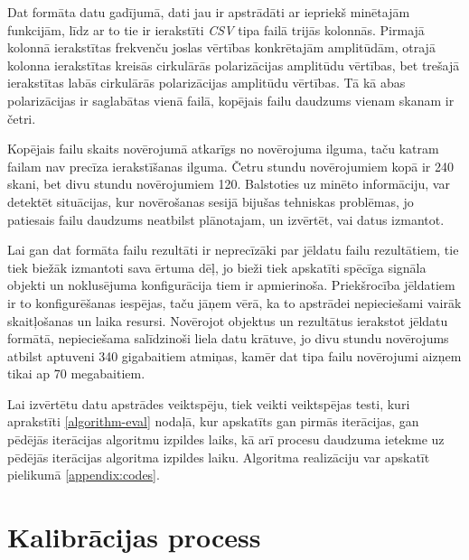 Dat formāta datu gadījumā, dati jau ir apstrādāti ar iepriekš minētajām funkcijām, līdz ar to tie ir ierakstīti \textit{CSV} tipa failā trijās kolonnās. Pirmajā kolonnā ierakstītas frekvenču joslas vērtības konkrētajām amplitūdām, otrajā kolonna ierakstītas kreisās cirkulārās polarizācijas amplitūdu vērtības, bet trešajā ierakstītas labās cirkulārās polarizācijas amplitūdu vērtības. Tā kā abas polarizācijas ir saglabātas vienā failā, kopējais failu daudzums vienam skanam ir četri.

Kopējais failu skaits novērojumā atkarīgs no novērojuma ilguma, taču katram failam nav precīza ierakstīšanas ilguma. Četru stundu novērojumiem kopā ir 240 skani, bet divu stundu novērojumiem 120. Balstoties uz minēto informāciju, var detektēt situācijas, kur novērošanas sesijā bijušas tehniskas problēmas, jo patiesais failu daudzums neatbilst plānotajam, un izvērtēt, vai datus izmantot.

Lai gan dat formāta failu rezultāti ir neprecīzāki par jēldatu failu rezultātiem, tie tiek biežāk izmantoti sava ērtuma dēļ, jo bieži tiek apskatīti spēcīga signāla objekti un noklusējuma konfigurācija tiem ir apmierinoša. Priekšrocība jēldatiem ir to konfigurēšanas iespējas, taču jāņem vērā, ka to apstrādei nepieciešami vairāk skaitļošanas un laika resursi. Novērojot objektus un rezultātus ierakstot jēldatu formātā,  nepieciešama salīdzinoši liela datu krātuve, jo divu stundu novērojums atbilst aptuveni 340 gigabaitiem atmiņas, kamēr dat tipa failu novērojumi aizņem tikai ap 70 megabaitiem.

Lai izvērtētu datu apstrādes veiktspēju, tiek veikti veiktspējas testi, kuri aprakstīti \ref{algorithm-eval} nodaļā, kur apskatīts gan pirmās iterācijas, gan pēdējās iterācijas algoritmu izpildes laiks, kā arī procesu daudzuma ietekme uz pēdējās iterācijas algoritma izpildes laiku. Algoritma realizāciju var apskatīt pielikumā \ref{appendix:codes}.



\section{Kalibrācijas process} \label{calibration}

